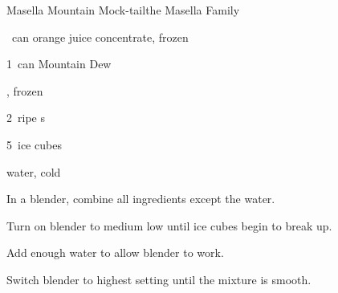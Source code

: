 \begin{recipe}{Masella Mountain Mock-tail}{the Masella Family}{}

\begin{ingredients}
\item \half~can orange juice concentrate, frozen
\item 1~can Mountain Dew
\item \C{\half} , frozen
\item 2~ripe s
\item 5~ice cubes
\item water, cold
\end{ingredients}

\begin{directions}
\item In a blender, combine all ingredients except the water.
\item Turn on blender to medium low until ice cubes begin to break up.
\item Add enough water to allow blender to work.
\item Switch blender to highest setting until the mixture is smooth.
\end{directions}

\end{recipe}
